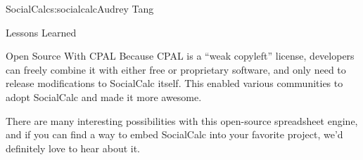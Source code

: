 \begin{aosachapter}{SocialCalc}{s:socialcalc}{Audrey Tang}
\begin{aosasect1}{Lessons Learned}
\begin{aosasect2}{Open Source With CPAL}
Because CPAL is a ``weak copyleft'' license, developers can freely
combine it with either free or proprietary software, and only need to
release modifications to SocialCalc itself.  This enabled various
communities to adopt SocialCalc and made it more awesome.


There are many interesting possibilities with this open-source
spreadsheet engine, and if you can find a way to embed SocialCalc
into your favorite project, we'd definitely love to hear about it.

\end{aosasect2}

\end{aosasect1}

\end{aosachapter}
